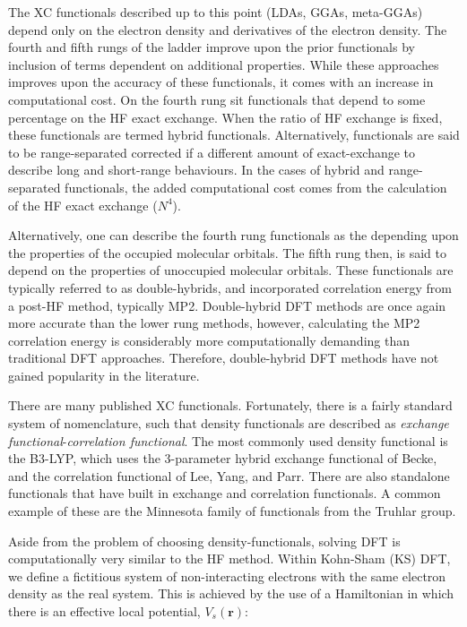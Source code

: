 The XC functionals described up to this point (LDAs, GGAs, meta-GGAs) depend
only on the electron density and derivatives of the electron density. The
fourth and fifth rungs of the ladder improve upon the prior functionals by
inclusion of terms dependent on additional properties. While these approaches
improves upon the accuracy of these functionals, it comes with an increase in
computational cost. On the fourth rung sit functionals that depend to some
percentage on the HF exact exchange. When the ratio of HF exchange is fixed,
these functionals are termed hybrid functionals. Alternatively, functionals are
said to be range-separated corrected if a different amount of exact-exchange to
describe long and short-range behaviours. In the cases of hybrid and
range-separated functionals, the added computational cost comes from the
calculation of the HF exact exchange ($N^4$).

Alternatively, one can describe the fourth rung functionals as the depending
upon the properties of the occupied molecular orbitals. The fifth rung then, is
said to depend on the properties of unoccupied molecular orbitals. These
functionals are typically referred to as double-hybrids, and incorporated
correlation energy from a post-HF method, typically MP2.\cite{Goerigk2014}
Double-hybrid DFT methods are once again more accurate than the lower rung
methods, however, calculating the MP2 correlation energy is considerably more
computationally demanding than traditional DFT approaches. Therefore,
double-hybrid DFT methods have not gained popularity in the literature.

There are many published XC functionals. Fortunately, there is a fairly
standard system of nomenclature, such that density functionals are described as
\emph{exchange functional}-\emph{correlation functional}. The most commonly
used density functional is the  B3-LYP, which uses the 3-parameter hybrid
exchange functional of Becke,\cite{Becke1993} and the correlation functional of
Lee, Yang, and Parr.\cite{Lee1988} There are also standalone functionals that
have built in exchange and correlation functionals. A common example of these
are the Minnesota family of functionals from the Truhlar
group.\cite{Zhao2006,Zhao2006a}

Aside from the problem of choosing density-functionals, solving DFT is
computationally very similar to the HF method. Within Kohn-Sham (KS) DFT, we
define a fictitious system of non-interacting electrons with the same electron
density as the real system. This is achieved by the use of a Hamiltonian in
which there is an effective local potential, $V_s(\mathbf{r})$:

